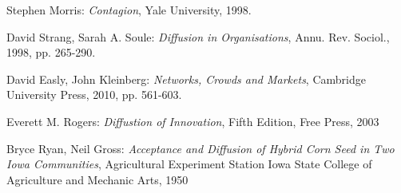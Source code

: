\documentclass[12pt]{article}
\begin{document}
\begin{thebibliography}{9}

  Stephen Morris:
  \emph{Contagion},
  Yale University,
  1998.
 
	David Strang, Sarah A. Soule:
	\emph{Diffusion in Organisations},
	Annu. Rev. Sociol., 1998, pp. 265-290.
	
	David Easly, John Kleinberg: 
	\emph{Networks, Crowds and Markets},
	Cambridge University Press, 2010, pp. 561-603.
	
	Everett M. Rogers: \emph{Diffustion of Innovation}, Fifth
	Edition, Free Press, 2003
	
 Bryce Ryan, Neil Gross: \emph{Acceptance and 		    Diffusion of Hybrid Corn Seed in Two Iowa Communities}, Agricultural Experiment Station Iowa State College of Agriculture and Mechanic Arts, 1950
\end{thebibliography}
\end{document}
